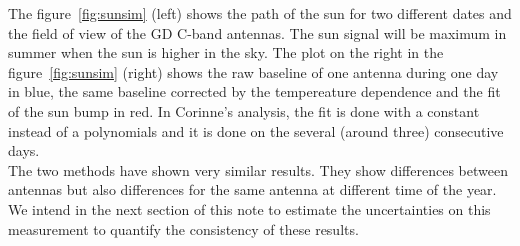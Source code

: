 The figure~\ref{fig:sunsim} (left)  shows the path of the  sun for two
different dates and the field of  view of the GD C-band antennas.  The
sun signal  will be maximum  in summer when  the sun is higher  in the
sky.   The plot on  the right  in the  figure~\ref{fig:sunsim} (right)
shows the raw baseline of one antenna during one day in blue, the same
baseline corrected by  the tempereature dependence and the  fit of the
sun  bump in  red.  In  Corinne's  analysis, the  fit is  done with  a
constant  instead of  a  polynomials and  it  is done  on the  several
(around three)  consecutive days.  \\The  two methods have  shown very
similar  results.  They  show  differences between  antennas but  also
differences for  the same  antenna at different  time of the  year. We
intend in the next section  of this note to estimate the uncertainties
on this measurement to quantify the consistency of these results. 





